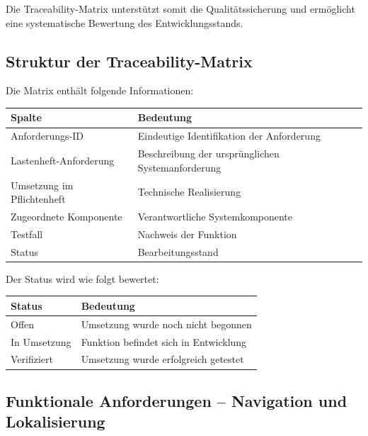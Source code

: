 Die Traceability-Matrix unterstützt somit die Qualitätssicherung und
ermöglicht eine systematische Bewertung des Entwicklungsstands.

\subsection{Struktur der
Traceability-Matrix}\label{struktur-der-traceability-matrix}

Die Matrix enthält folgende Informationen:

\begin{longtable}[]{@{}
  >{\raggedright\arraybackslash}p{}
  >{\raggedright\arraybackslash}p{}@{}}
\toprule\noalign{}
\begin{minipage}[b]{\linewidth}\raggedright
Spalte
\end{minipage} & \begin{minipage}[b]{\linewidth}\raggedright
Bedeutung
\end{minipage} \\
\midrule\noalign{}
\endhead
\bottomrule\noalign{}
\endlastfoot
Anforderungs-ID & Eindeutige Identifikation der Anforderung \\
Lastenheft-Anforderung & Beschreibung der ursprünglichen
Systemanforderung \\
Umsetzung im Pflichtenheft & Technische Realisierung \\
Zugeordnete Komponente & Verantwortliche Systemkomponente \\
Testfall & Nachweis der Funktion \\
Status & Bearbeitungsstand \\
\end{longtable}

Der Status wird wie folgt bewertet:

\begin{longtable}[]{@{}ll@{}}
\toprule\noalign{}
Status & Bedeutung \\
\midrule\noalign{}
\endhead
\bottomrule\noalign{}
\endlastfoot
Offen & Umsetzung wurde noch nicht begonnen \\
In Umsetzung & Funktion befindet sich in Entwicklung \\
Verifiziert & Umsetzung wurde erfolgreich getestet \\
\end{longtable}

\subsection{Funktionale Anforderungen -- Navigation und
Lokalisierung}\label{funktionale-anforderungen-navigation-und-lokalisierung}

